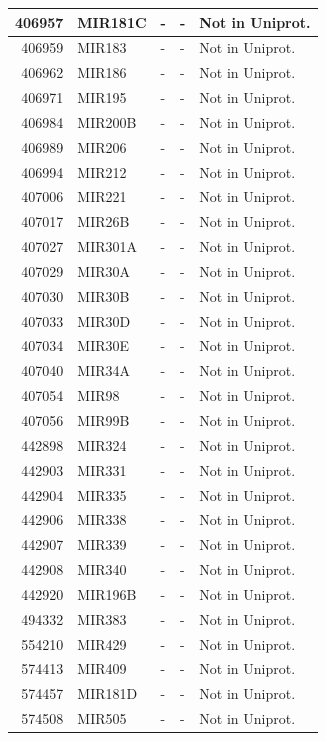 \documentclass[
]{article}
\begin{document}
\begin{table}[H]
\begin{tabular}[t]{r|l|l|l|l}
\hline
406957 & MIR181C & - & - & Not in Uniprot.\\
\hline
406959 & MIR183 & - & - & Not in Uniprot.\\
\hline
406962 & MIR186 & - & - & Not in Uniprot.\\
\hline
406971 & MIR195 & - & - & Not in Uniprot.\\
\hline
406984 & MIR200B & - & - & Not in Uniprot.\\
\hline
406989 & MIR206 & - & - & Not in Uniprot.\\
\hline
406994 & MIR212 & - & - & Not in Uniprot.\\
\hline
407006 & MIR221 & - & - & Not in Uniprot.\\
\hline
407017 & MIR26B & - & - & Not in Uniprot.\\
\hline
407027 & MIR301A & - & - & Not in Uniprot.\\
\hline
407029 & MIR30A & - & - & Not in Uniprot.\\
\hline
407030 & MIR30B & - & - & Not in Uniprot.\\
\hline
407033 & MIR30D & - & - & Not in Uniprot.\\
\hline
407034 & MIR30E & - & - & Not in Uniprot.\\
\hline
407040 & MIR34A & - & - & Not in Uniprot.\\
\hline
407054 & MIR98 & - & - & Not in Uniprot.\\
\hline
407056 & MIR99B & - & - & Not in Uniprot.\\
\hline
442898 & MIR324 & - & - & Not in Uniprot.\\
\hline
442903 & MIR331 & - & - & Not in Uniprot.\\
\hline
442904 & MIR335 & - & - & Not in Uniprot.\\
\hline
442906 & MIR338 & - & - & Not in Uniprot.\\
\hline
442907 & MIR339 & - & - & Not in Uniprot.\\
\hline
442908 & MIR340 & - & - & Not in Uniprot.\\
\hline
442920 & MIR196B & - & - & Not in Uniprot.\\
\hline
494332 & MIR383 & - & - & Not in Uniprot.\\
\hline
554210 & MIR429 & - & - & Not in Uniprot.\\
\hline
574413 & MIR409 & - & - & Not in Uniprot.\\
\hline
574457 & MIR181D & - & - & Not in Uniprot.\\
\hline
574508 & MIR505 & - & - & Not in Uniprot.\\

\end{tabular}
\end{table}
\end{document}
